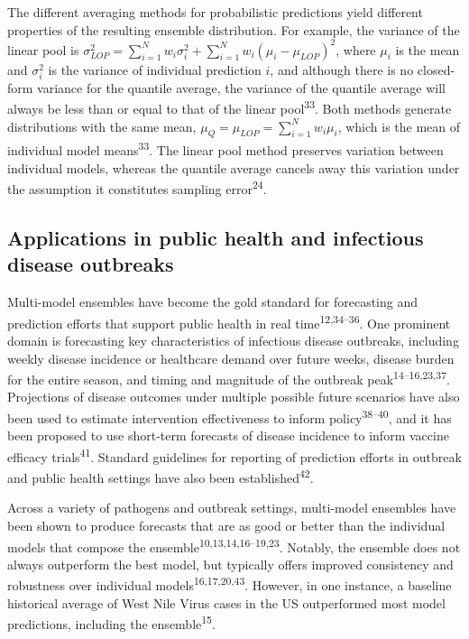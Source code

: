 \documentclass[
]{article}
\begin{document}
The different averaging methods for probabilistic predictions yield
different properties of the resulting ensemble distribution. For
example, the variance of the linear pool is
\(\sigma^2_{LOP} = \sum_{i=1}^Nw_i\sigma_i^2 + \sum_{i=1}^Nw_i(\mu_i-\mu_{LOP})^2\),
where \(\mu_i\) is the mean and \(\sigma^2_i\) is the variance of
individual prediction \(i\), and although there is no closed-form
variance for the quantile average, the variance of the quantile average
will always be less than or equal to that of the linear
pool\textsuperscript{33}. Both methods generate distributions with the
same mean, \(\mu_Q = \mu_{LOP} = \sum_{i=1}^Nw_i\mu_i\), which is the
mean of individual model means\textsuperscript{33}. The linear pool
method preserves variation between individual models, whereas the
quantile average cancels away this variation under the assumption it
constitutes sampling error\textsuperscript{24}.

\subsection{Applications in public health and infectious disease
outbreaks}\label{applications-in-public-health-and-infectious-disease-outbreaks}

Multi-model ensembles have become the gold standard for forecasting and
prediction efforts that support public health in real
time\textsuperscript{12,34--36}. One prominent domain is forecasting key
characteristics of infectious disease outbreaks, including weekly
disease incidence or healthcare demand over future weeks, disease burden
for the entire season, and timing and magnitude of the outbreak
peak\textsuperscript{14--16,23,37}. Projections of disease outcomes
under multiple possible future scenarios have also been used to estimate
intervention effectiveness to inform policy\textsuperscript{38--40}, and
it has been proposed to use short-term forecasts of disease incidence to
inform vaccine efficacy trials\textsuperscript{41}. Standard guidelines
for reporting of prediction efforts in outbreak and public health
settings have also been established\textsuperscript{42}.

Across a variety of pathogens and outbreak settings, multi-model
ensembles have been shown to produce forecasts that are as good or
better than the individual models that compose the
ensemble\textsuperscript{10,13,14,16--19,23}. Notably, the ensemble does
not always outperform the best model, but typically offers improved
consistency and robustness over individual
models\textsuperscript{16,17,20,43}. However, in one instance, a
baseline historical average of West Nile Virus cases in the US
outperformed most model predictions, including the
ensemble\textsuperscript{15}.
\end{document}
